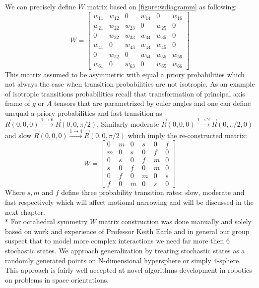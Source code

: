 We can precisely define $W$ matrix based on \ref{figure:wdiagramm} as following: 
\begin{equation}\label{eq:Wmat1}
W = \begin{bmatrix}
       w_{11} & w_{12} & 0 & w_{14} & 0 & w_{16}  \\[0.3em]
       w_{21} & w_{22} & w_{23} & 0 & w_{25} & 0  \\[0.3em]
       0 & w_{32} & w_{33} & w_{34} & w_{35} & 0  \\[0.3em]
       w_{41} & 0 & w_{43} & w_{44} & w_{45} & 0 \\[0.3em]
       0 & w_{52} & 0 & w_{54} & w_{55} & w_{56} \\[0.3em]
       w_{61} & 0 & w_{63} & 0 & w_{65} & w_{66} 
     \end{bmatrix}
\end{equation}
This matrix assumed to be asymmetric with equal a priory probabilities which not always the case when transition probabilities are not isotropic. As an example of isotropic transitions probabilities recall that transformation of principal axis frame of $g$ or $A$ tensors that are parametrized by euler angles and one can define unequal a priory probabilities and fast transition as $\vec{R}(0,0,0)\xrightarrow {1\rightarrow 6}\vec{R}(0,0,\pi/2)$. Similarly moderate $\vec{R}(0,0,0)\xrightarrow {1\rightarrow 2}\vec{R}(0,\pi/2,0)$  and slow $\vec{R}(0,0,0)\xrightarrow {1\rightarrow 4}\vec{R}(0,0,\pi/2)$ which imply the re-constructed matrix:   
\begin{equation}\label{eq:Wmat2}
W = \begin{bmatrix}
       0 & m & 0 & s & 0 & f  \\[0.3em]
       m & 0 & s & 0 & f & 0  \\[0.3em]
       0 & s & 0 & f & m & 0  \\[0.3em]
       s & 0 & f & 0 & m & 0 \\[0.3em]
       0 & f & 0 & m & 0 & s \\[0.3em]
       f & 0 & m & 0 & s & 0 
     \end{bmatrix}
\end{equation}
Where $s,m$ and $f$ define three probability transition rates: slow, moderate and fast respectively which will affect motional narrowing and will be discussed in the next chapter.\\*
For octahedral symmetry $W$ matrix construction was done manually and solely based on work and experience of Professor Keith Earle and in general our group suspect that to model more complex interactions we need far more then 6 stochastic states. We approach generalization by treating stochastic states as a randomly generated points on N-dimensional hypersphere or simply 4-sphere. This approach is fairly well accepted at novel algorithms development in robotics on problems in space orientations\cite{robotics}\cite{ershova}. 
